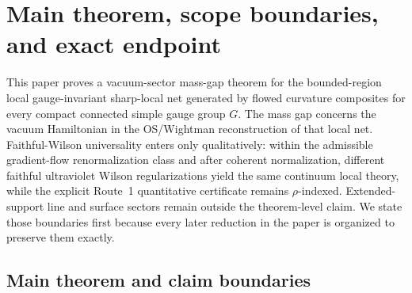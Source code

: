 \section{Main theorem, scope boundaries, and exact endpoint}\label{sec:scope}

This paper proves a vacuum-sector mass-gap theorem for the bounded-region local gauge-invariant sharp-local net generated by flowed curvature composites for every compact connected simple gauge group $G$. The mass gap concerns the vacuum Hamiltonian in the OS/Wightman reconstruction of that local net. Faithful-Wilson universality enters only qualitatively: within the admissible gradient-flow renormalization class and after coherent normalization, different faithful ultraviolet Wilson regularizations yield the same continuum local theory, while the explicit Route~1 quantitative certificate remains $\rho$-indexed. Extended-support line and surface sectors remain outside the theorem-level claim. We state those boundaries first because every later reduction in the paper is organized to preserve them exactly.

\subsection{Main theorem and claim boundaries}

